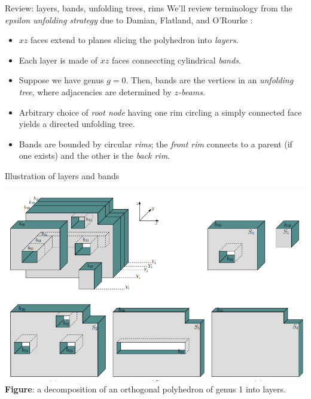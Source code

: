 \documentclass[handout]{beamer}
\theoremstyle{plain}
\begin{document}
  \begin{frame}{Review: layers, bands, unfolding trees, rims}
    We'll review terminology from the \emph{epsilon unfolding strategy} due to Damian, Flatland, and O'Rourke :
    \begin{itemize}
      \pause \item $xz$ faces extend to planes slicing the polyhedron into \emph{layers}.
      \pause \item Each layer is made of $xz$ faces conneccting cylindrical \emph{bands}.
      \pause \item Suppose we have genus $g = 0$.
        Then, bands are the vertices in an \emph{unfolding tree}, where adjacencies are determined by \emph{$z$-beams}.
      \pause \item Arbitrary choice of \emph{root node} having one rim circling a simply connected face yields a directed unfolding tree.
      \pause \item Bands are bounded by circular \emph{rims}; the \emph{front rim} connects to a parent (if one exists) and the other is the \emph{back rim}.
    \end{itemize}
  \end{frame}

  \begin{frame}{Illustration of layers and bands}
    \begin{center}
      \includegraphics[width=.9\textwidth]{./figs/Layer_decomposition.png}\\
      \tiny \textbf{Figure}: a decomposition of an orthogonal polyhedron of genus 1 into layers.
    \end{center}
  \end{frame}
\end{document}
